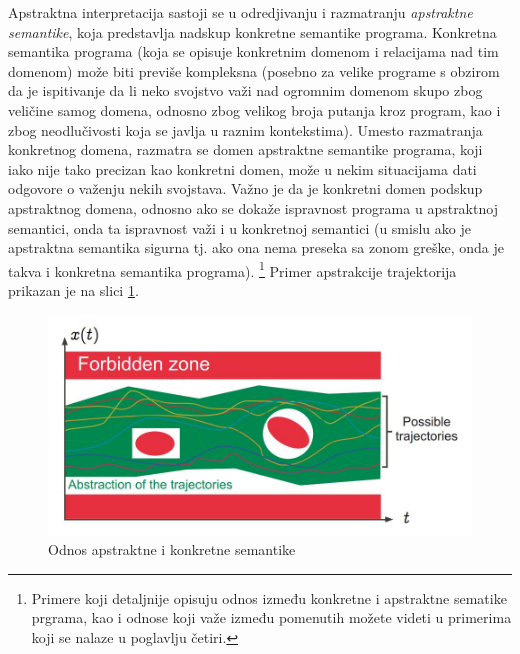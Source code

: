 \documentclass[a4paper]{article}
\begin{document}
Apstraktna interpretacija sastoji se u odredjivanju i razmatranju \textit{apstraktne semantike}, koja predstavlja nadskup konkretne semantike programa. Konkretna semantika programa (koja se opisuje konkretnim domenom i relacijama nad tim domenom) može biti previše kompleksna (posebno za velike programe s obzirom da je ispitivanje da li neko svojstvo važi nad ogromnim domenom skupo zbog veličine samog domena, odnosno zbog velikog broja putanja kroz program, kao i zbog neodlučivosti koja se javlja u raznim kontekstima). Umesto razmatranja konkretnog domena, razmatra se domen apstraktne semantike programa, koji iako nije tako precizan kao konkretni domen, može u nekim situacijama dati odgovore o važenju nekih svojstava. Važno je da je konkretni domen podskup apstraktnog domena, odnosno ako se dokaže ispravnost programa u apstraktnoj semantici, onda ta ispravnost važi i u konkretnoj semantici (u smislu ako je apstraktna semantika sigurna tj. ako ona nema preseka sa zonom greške, onda je takva i konkretna semantika programa). \footnote{Primere koji detaljnije opisuju odnos između konkretne i apstraktne sematike prgrama, kao i odnose koji važe između pomenutih možete videti u primerima koji se nalaze u poglavlju četiri.} Primer apstrakcije trajektorija prikazan je na slici \ref{fig:graf4}.
\begin{figure}[h!]
\begin{center}
\includegraphics[scale=0.35]{graf4.JPG}
\end{center}
\caption{Odnos apstraktne i konkretne semantike}
\label{fig:graf4}
\end{figure} \newline
\end{document}
